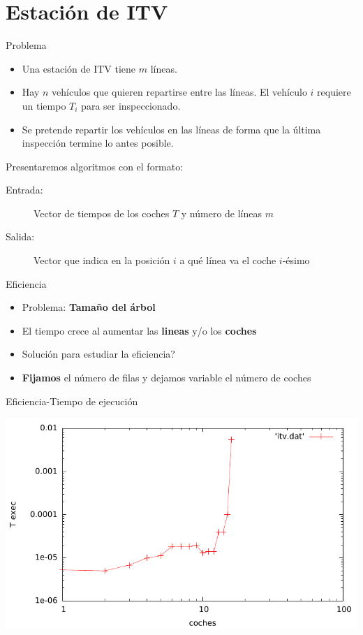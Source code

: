 \section{Estación de ITV}

\begin{frame}{Problema}
\begin{itemize}
	\item Una estación de ITV tiene $m$ líneas.
	\pause
	\item Hay $n$ vehículos que quieren repartirse entre las líneas. El vehículo $i$
	requiere un tiempo $T_i$ para ser inspeccionado.
	\pause
	\item Se pretende repartir los vehículos en las líneas de forma que la última
	inspección termine lo antes posible.
\end{itemize}
\pause

Presentaremos algoritmos con el formato:
\begin{description}
 \item[Entrada:] Vector de tiempos de los coches $T$ y número de líneas $m$
 \item[Salida:] Vector que indica en la posición $i$ a qué línea va el coche $i$-ésimo
\end{description}
\end{frame}


\begin{frame}{Eficiencia}
	\begin{itemize}
		\item Problema: \textbf{Tamaño del árbol}
		\pause
		\item El tiempo crece al aumentar las \textbf{lineas} y/o los \textbf{coches}
		\pause
		\item Solución para estudiar la eficiencia?
		\pause
		\item \textbf{Fijamos} el número de filas y dejamos variable el número de coches
	\end{itemize}
\end{frame}

\begin{frame}{Eficiencia-Tiempo de ejecución}
	\begin{center}
		\includegraphics[width = \linewidth]{img/itvEficiencia}
	\end{center}
\end{frame}

